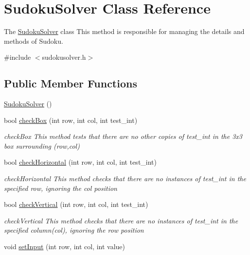 \hypertarget{class_sudoku_solver}{}\section{Sudoku\+Solver Class Reference}
\label{class_sudoku_solver}


The \hyperlink{class_sudoku_solver}{Sudoku\+Solver} class This method is responsible for managing the details and methods of Sudoku.  




{\ttfamily \#include $<$sudokusolver.\+h$>$}

\subsection*{Public Member Functions}
\begin{DoxyCompactItemize}
\item 
\hyperlink{class_sudoku_solver_a4bf48e09a67caff942c166ac70e42fc9}{Sudoku\+Solver} ()
\item 
bool \hyperlink{class_sudoku_solver_a14e6df202ad279fbafaf7f348f53c535}{check\+Box} (int row, int col, int test\+\_\+int)
\begin{DoxyCompactList}\small\item\em check\+Box This method tests that there are no other copies of test\+\_\+int in the 3x3 box surrounding (row,col) \end{DoxyCompactList}\item 
bool \hyperlink{class_sudoku_solver_a9312f9906262defb7ae6f4d1a56fda00}{check\+Horizontal} (int row, int col, int test\+\_\+int)
\begin{DoxyCompactList}\small\item\em check\+Horizontal This method checks that there are no instances of test\+\_\+int in the specified row, ignoring the col position \end{DoxyCompactList}\item 
bool \hyperlink{class_sudoku_solver_aecc3f72bcd6c4ba906fc20c43bd54579}{check\+Vertical} (int row, int col, int test\+\_\+int)
\begin{DoxyCompactList}\small\item\em check\+Vertical This method checks that there are no instances of test\+\_\+int in the specified column(col), ignoring the row position \end{DoxyCompactList}\item 
void \hyperlink{class_sudoku_solver_ad58cafeeb1cc40f57f37e5fac00ea40b}{set\+Input} (int row, int col, int value)

\end{DoxyCompactItemize}

